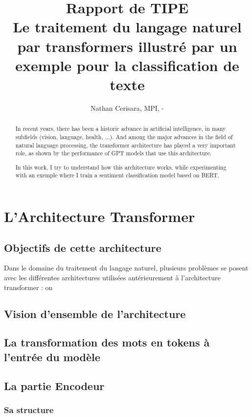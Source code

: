 \documentclass[12pt,a4paper]{article}
\title{Rapport de TIPE \\
Le traitement du langage naturel par transformers illustré par un exemple pour la classification de texte}
\author{Nathan Cerisara, MPI, \oldstylenums{2022}-\oldstylenums{2023}}
\begin{document}
\maketitle

\begin{abstract}

    In recent years, there has been a historic advance in artificial intelligence, in many subfields (vision, language, health, ...). And among the major advances in the field of natural language processing, the transformer architecture has played a very important role, as shown by the performance of GPT models that use this architecture.
    
    In this work, I try to understand how this architecture works, while experimenting with an exemple where I train a sentiment classification model based on BERT.
\end{abstract}

\section{L'Architecture Transformer}

\subsection{Objectifs de cette architecture}

	Dans le domaine du traitement du langage naturel, plusieurs problèmes se posent avec les différentes architectures utilisées antérieurement à l'architecture transformer : on 

\subsection{Vision d'ensemble de l'architecture}

\subsection{La transformation des mots en tokens à l'entrée du modèle}

\subsection{La partie Encodeur}

\subsubsection{Sa structure}
\end{document}
